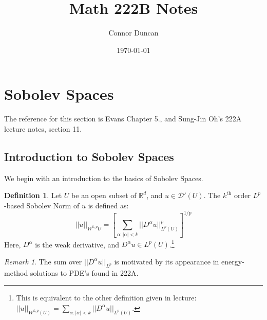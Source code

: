 \documentclass[letterpaper,10pt]{article}
\author{Connor Duncan}
\title{Math 222B Notes}
\date{\today}
\newcommand{\wkp}{W^{k,p}}
\theoremstyle{definition}
\newtheorem{dfn}{Definition}
\theoremstyle{remark}
\newtheorem*{rmk}{Remark}
\theoremstyle{plain}
\begin{document}
\maketitle
\tableofcontents

\section{Sobolev Spaces}
The reference for this section is Evans Chapter 5., and Sung-Jin Oh's 222A lecture
notes, section 11.

\subsection{Introduction to Sobolev Spaces} %
We begin with an introduction to the basics of Sobolev Spaces.
\begin{dfn}
    Let $U$ be an open subset of $\mathbb R^d$, and $u\in\mathcal D'(U)$.
    The $k^{\text{th}}$ order $L^p$-based Sobolev Norm of $u$ is defined as:
    $$
    ||u||_{W^{k,p}{U}}=\left[\sum_{\alpha:|\alpha|<k}^{}||D^\alpha u||_{L^p(U)}^p\right]^{1/p}
    $$
    Here, $D^\alpha$ is the weak derivative, and $D^\alpha u\in L^p(U)$.\footnote{This is equivalent to the other definition given in lecture:
        $||u||_{\wkp(U)}=\sum_{\alpha:|\alpha|<k}^{}||D^\alpha u||_{L^p(U)}$.
    }
\end{dfn}

\begin{rmk}
    The sum over $||D^\alpha u||_{L^p}$ is motivated by its appearance in 
    energy-method solutions to PDE's found in 222A.
\end{rmk}
\end{document}
